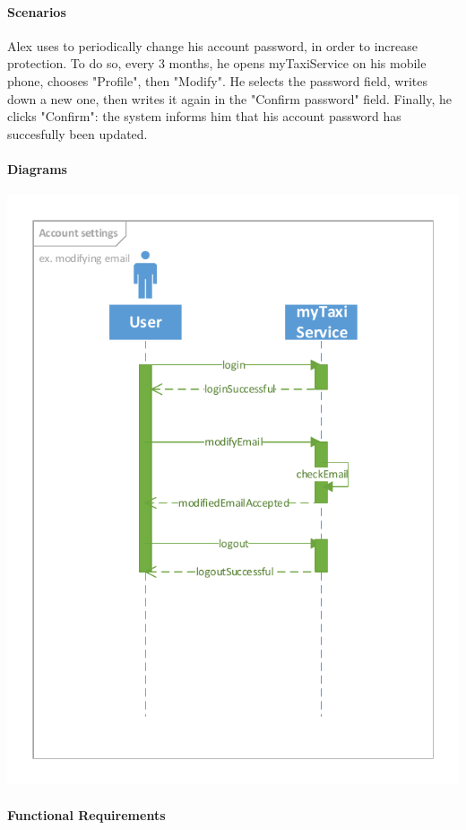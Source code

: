 \paragraph{Scenarios}
Alex uses to periodically change his account password, in order to increase protection. To do so, every 3 months, he opens myTaxiService on his mobile phone, chooses "Profile", then "Modify". He selects the password field, writes down a new one, then writes it again in the "Confirm password" field. Finally, he clicks "Confirm": the system informs him that his account password has succesfully been updated.

\paragraph{Diagrams}
\begin{center}
	\includegraphics[width=\textwidth]{diagrams/account_settings}
\end{center}
\paragraph{Functional Requirements}
